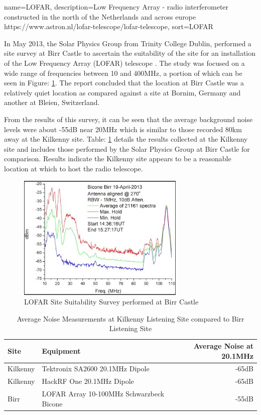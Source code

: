 \documentclass[runningheads,a4paper]{llncs}
\begin{document}
{
  name={LOFAR},
  description={Low Frequency Array - radio interferometer constructed in the north of the Netherlands and across europe https://www.astron.nl/lofar-telescope/lofar-telescope},
  sort=LOFAR
}

In May 2013, the Solar Physics Group from Trinity College Dublin, performed a site survey at Birr Castle to ascertain the suitability of the site for an installation of the Low Frequency Array (\gls{LOFAR}) telescope \citep{craf-13}. The study was focused on a wide range of frequencies between 10 and 400MHz, a portion of which can be seen in Figure: \ref{fig:site_survey_lofar}. The report concluded that the location at Birr Castle was a relatively quiet location as compared against a site at Bornim, Germany and another at Bleien, Switzerland. 

From the results of this survey, it can be seen that the average background noise levels were about -55dB near 20MHz which is similar to those recorded 80km away at the Kilkenny site. Table: \ref{tab:site_survey} details the results collected at the Kilkenny site and includes those performed by the Solar Physics Group at Birr Castle for comparison. Results indicate the Kilkenny site appears to be a reasonable location at which to host the radio telescope.

%
\begin{figure}[here]
\centering
\includegraphics[width=8cm]{images/35}
\caption{LOFAR Site Suitability Survey performed at Birr Castle \citep{craf-13}}
\label{fig:site_survey_lofar}
\end{figure}
%

%
\begin{table}
  \centering
  \begin{tabular}{p{2cm} l r}
    \toprule
    Site & Equipment & Average Noise at 20.1MHz \\ \midrule
    Kilkenny & Tektronix SA2600 20.1MHz Dipole & -65dB  \\
    Kilkenny & HackRF One 20.1MHz Dipole & -65dB \\
    Birr & LOFAR Array 10-100MHz Schwarzbeck Bicone & -55dB \\
    \bottomrule
  \end{tabular}
  \caption{Average Noise Measurements at Kilkenny Listening Site compared to Birr Listening Site \citep{craf-13}}
  \label{tab:site_survey}
\end{table}
%
\end{document}

